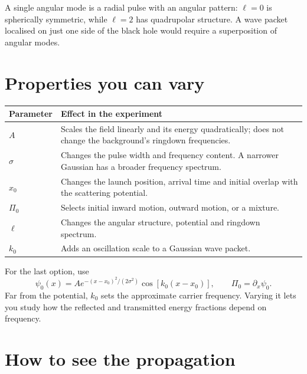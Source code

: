 \documentclass[11pt,a4paper]{article}
\begin{document}
A single angular mode is a radial pulse with an angular pattern:
\(\ell=0\) is spherically symmetric, while \(\ell=2\) has quadrupolar
structure. A wave packet localised on just one side of the black hole
would require a superposition of angular modes.

\section{Properties you can vary}

\begin{tabularx}{\textwidth}{@{}lX@{}}
\toprule
Parameter & Effect in the experiment \\
\midrule
\(A\) & Scales the field linearly and its energy quadratically; does not
change the background's ringdown frequencies. \\
\(\sigma\) & Changes the pulse width and frequency content. A narrower
Gaussian has a broader frequency spectrum. \\
\(x_0\) & Changes the launch position, arrival time and initial overlap
with the scattering potential. \\
\(\Pi_0\) & Selects initial inward motion, outward motion, or a mixture. \\
\(\ell\) & Changes the angular structure, potential and ringdown spectrum. \\
\(k_0\) & Adds an oscillation scale to a Gaussian wave packet. \\
\bottomrule
\end{tabularx}

For the last option, use
\begin{equation}
 \psi_0(x)=A e^{-(x-x_0)^2/(2\sigma^2)}
             \cos\!\left[k_0(x-x_0)\right],
 \qquad \Pi_0=\partial_x\psi_0.
\end{equation}
Far from the potential, \(k_0\) sets the approximate carrier frequency.
Varying it lets you study how the reflected and transmitted energy
fractions depend on frequency.

\clearpage
\section{How to see the propagation}
\end{document}
